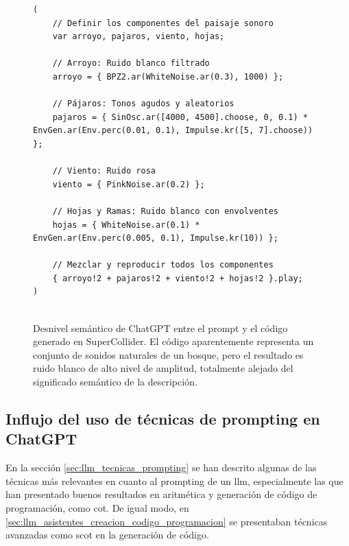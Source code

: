\begin{figure}[H]
    \caption[Desnivel semántico de ChatGPT entre el prompt y el código generado en SuperCollider]{Desnivel semántico de ChatGPT entre el prompt y el código generado en SuperCollider. El código aparentemente representa un conjunto de sonidos naturales de un bosque, pero el resultado es ruido blanco de alto nivel de amplitud, totalmente alejado del significado semántico de la descripción.}
    \centering
    \begin{lstlisting}[style=SuperCollider-IDE, basicstyle=\footnotesize\ttfamily, numbers=none]
(
    // Definir los componentes del paisaje sonoro
    var arroyo, pajaros, viento, hojas;
    
    // Arroyo: Ruido blanco filtrado
    arroyo = { BPZ2.ar(WhiteNoise.ar(0.3), 1000) };
    
    // Pájaros: Tonos agudos y aleatorios
    pajaros = { SinOsc.ar([4000, 4500].choose, 0, 0.1) * EnvGen.ar(Env.perc(0.01, 0.1), Impulse.kr([5, 7].choose)) };
    
    // Viento: Ruido rosa
    viento = { PinkNoise.ar(0.2) };
    
    // Hojas y Ramas: Ruido blanco con envolventes
    hojas = { WhiteNoise.ar(0.1) * EnvGen.ar(Env.perc(0.005, 0.1), Impulse.kr(10)) };
    
    // Mezclar y reproducir todos los componentes
    { arroyo!2 + pajaros!2 + viento!2 + hojas!2 }.play;
)
            
    \end{lstlisting}
    \source{\propio}
    \label{fig:ChatGPT_desnivel_semantico}
\end{figure}



\subsection{Influjo del uso de técnicas de {prompting} en ChatGPT}

En la sección \ref{sec:llm_tecnicas_prompting} se han descrito algunas de las técnicas más relevantes en cuanto al prompting de un \gls{llm}, especialmente las que han presentado buenos resultados en aritmética y generación de código de programación, como \gls{cot}. De igual modo, en \ref{sec:llm_asistentes_creacion_codigo_programacion} se presentaban técnicas avanzadas como \gls{scot} en la generación de código.

